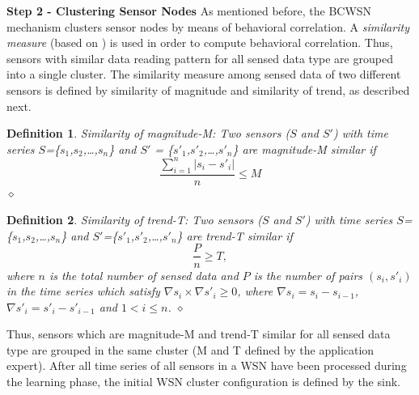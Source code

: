 \documentclass{acm_proc_article-sp}
\newcommand{\dia}{\hspace*{.1cm} \hfill $\diamond$}
\begin{document}
{\bf Step 2 - Clustering Sensor Nodes}
As mentioned before, the BCWSN mechanism clusters sensor nodes by means of
behavioral correlation. A \textit{similarity measure} (based on \cite{Liu2007})
is used in order to compute behavioral correlation. Thus, sensors with similar
data reading pattern for all sensed data type are grouped into a single cluster.
The similarity measure among sensed data of two different sensors is defined by
similarity of magnitude and similarity of trend, as described next.
\vspace*{-.3cm}

\newtheorem{defini}{Definition}

\begin{defini}
Similarity of magnitude-M: Two sensors ($S$ and $S'$) with time series
$S$=\{$s_{1}$,$s_{2}$,\ldots,$s_{n}$\} and
$S'$ = \{$s'_{1}$,$s'_{2}$,\ldots,$s'_{n}$\} are magnitude-M similar if 
\begin{equation}
\label{equ:magni}
\frac{\sum_{i=1}^{n} |s_{i}-s'_{i}|}{n} \leq M
\end{equation}
\dia
\end{defini}
\vspace*{-.9cm}

\begin{defini}
Similarity of trend-T: Two sensors ($S$ and $S'$) with time series
$S$=\{$s_{1}$,$s_{2}$,\ldots,$s_{n}$\} and
$S'$=\{$s'_{1}$,$s'_{2}$,\ldots,$s'_{n}$\} are trend-T similar if 
\begin{equation}
\label{equ:trend}
\frac{P}{n} \geq T,
\end{equation}
where $n$ is the total number of sensed data and $P$ is the number of pairs
$(s_{i},s'_{i})$ in the time series which satisfy $\nabla s_{i} \times \nabla
s'_{i} \geq 0$, where $\nabla s_{i} = s_{i} - s_{i-1}$, $\nabla
s'_{i} = s'_{i} - s'_{i-1}$ and $1 < i \leq n$.
\dia
\end{defini}
\vspace*{-.5cm}

Thus, sensors which are magnitude-M and trend-T similar for all sensed data type
are grouped in the same cluster (M and T defined by the application expert).
After all time series of all sensors in a WSN have been processed during the
learning phase, the initial WSN cluster configuration is defined by the sink.
\vspace*{-.3cm}
\end{document}
